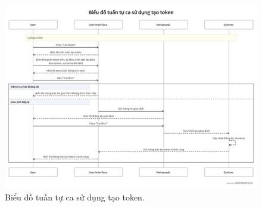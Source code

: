 \begin{figure}[H]
    \centering
    \includegraphics[width=1\textwidth]{figures/c2/TokenCreatedSeq.png}
    \caption{Biểu đồ tuần tự ca sử dụng tạo token.}
    \label{fig:architecture-diagram}
\end{figure}

